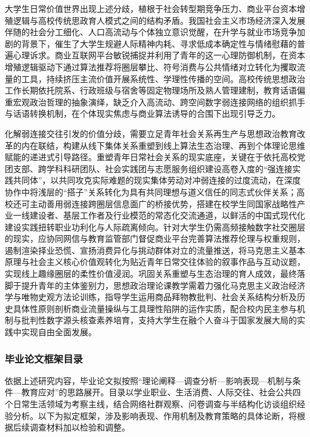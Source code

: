 大学生日常价值世界出现上述分歧，植根于社会转型期竞争压力、商业平台资本增殖逻辑与高校传统思政育人模式之间的结构矛盾。我国社会主义市场经济深入发展伴随的社会分工细化、人口高流动与个体独立意识觉醒，在升学与就业市场竞争加剧的背景下，催生了大学生规避人际精神内耗、寻求低成本确定性与情绪慰藉的普遍心理诉求。商业互联网平台敏锐捕捉并利用了青年的这一心理防御机制，在资本增殖逻辑驱动下通过算法推荐将圈层攀比、符号消费与公共情绪对立转化为攫取流量的工具，持续挤压主流价值开展系统性、学理性传播的空间。高校传统思想政治工作长期依托院系、行政班级与宿舍等固定物理场所及熟人管理建制，教育话语偏重宏观政治哲理的抽象演绎，缺乏介入高流动、跨空间数字弱连接网络的组织抓手与话语转换机制，在个体现实焦虑与商业算法诱导的合围下出现引导乏力。

化解弱连接交往引发的价值分歧，需要立足青年社会关系再生产与思想政治教育改革的内在联结，构建从线下集体关系重塑到线上算法生态治理、再到个体理论思维赋能的递进式引导路径。重塑青年日常社会关系的现实底座，关键在于依托高校党团支部、跨学科科研团队、社会实践团与志愿服务组织建设高卷入度的“强连接实践共同体”，以共同攻克实际难题的现实集体劳动对冲弱连接的过度流动，在深度协作中将浅层的“搭子”关系转化为具有共同理想与道义信任的同志式伙伴关系；高校还可主动善用弱连接跨圈层信息面广的桥接优势，搭建在校学生同国家战略性产业一线建设者、基层工作者及行业模范的常态化交流通道，以鲜活的中国式现代化建设实践扭转职业功利化与人际疏离倾向。针对大学生仍需高频接触数字社交圈层的现实，应协同网信与教育监管部门督促商业平台完善算法推荐伦理与权重规则，遏制渲染择业恐慌、宣扬消费异化与挑动群体对立的流量推送，将马克思主义基本原理与社会主义核心价值观转化为贴近青年日常交往体验的叙事作品与互动议题，实现线上趣缘圈层的柔性价值浸润。巩固关系重塑与生态治理的育人成效，最终落脚于提升青年的主体鉴别力，思想政治理论课教学需着力强化马克思主义政治经济学与唯物史观方法论训练，指导学生运用商品拜物教批判、社会关系结构分析及历史具体性原则剖析商业流量操纵与工具理性陷阱的运作实质，配合校内民主参与机制与批判性数字源头核查素养培育，支持大学生在融个人奋斗于国家发展大局的实践中实现自由全面发展。

\subsubsection{毕业论文框架目录}
\label{sec:thesis-outline}

依据上述研究内容，毕业论文拟按照“理论阐释—调查分析—影响表现—机制与条件—教育应对”的思路展开。目录以学业职业、生活消费、人际交往、社会公共四个日常生活领域为考察主线，结合网络社群观察、问卷调查与半结构化访谈组织经验分析。以下为拟定框架，涉及影响表现、作用机制及教育策略的具体论断，将根据后续调查材料加以检验和调整。

